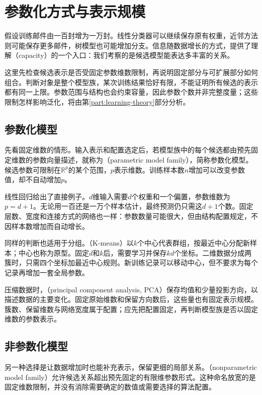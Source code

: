 \section{参数化方式与表示规模}
\label{sec:models-capacity}

假设训练邮件由一百封增为一万封。线性分类器可以继续保存原有权重，近邻方法则可能保存更多邮件，树模型也可能增加分支。信息随数据增长的方式，提供了理解（capacity）的一个入口：我们考察的是候选模型能表达多丰富的关系。

这里先检查候选表示是否受固定参数维数限制，再说明固定部分与可扩展部分如何组合。判断对象是整个模型族，某次训练结果恰好有限，不能证明所有候选的表示都有同一上限。参数范围与结构也会约束容量，因此参数个数并非完整度量；这些限制怎样影响泛化，将由第\ref{part:learning-theory}部分分析。

\subsection{参数化模型}
\label{sec:models-parametric}

先看固定维数的情形。输入表示和配置选定后，若模型族中的每个候选都由预先固定维数的参数向量描述，就称为（parametric model family），简称参数化模型。候选参数可限制在$\mathbb{R}^{p}$的某个范围，$p$表示维数。训练样本数$n$增加可以改变参数值，却不自动增加$p$。

线性回归给出了直接例子。$d$维输入需要$d$个权重和一个偏置，参数维数为$p=d+1$。无论用一百还是一万个样本估计，最终预测仍只需这$d+1$个数。固定层数、宽度和连接方式的网络也一样：参数数量可能很大，但由结构配置规定，不因样本数增加而自动增长。

同样的判断也适用于分组。（K-means）以$k$个中心代表群组，按最近中心分配新样本；中心也称为原型。固定$d$和$k$后，需要学习并保存$kd$个坐标。二维数据分成两簇时，只需四个坐标加最近中心规则。新训练记录可以移动中心，但不要求为每个记录再增加一套全局参数。

压缩数据时，（principal component analysis, PCA）保存均值和少量投影方向，以描述数据的主要变化。固定原始维数和保留方向数后，这些量也有固定表示规模。簇数、保留维数与网络宽度属于配置；应先把配置固定，再判断模型族是否以固定维数的参数表示。

\subsection{非参数化模型}
\label{sec:models-nonparametric}

另一种选择是让数据增加时也能补充表示，保留更细的局部关系。（nonparametric model family）允许候选关系超出预先固定的有限维参数形式。这种命名放宽的是固定维数限制，并没有消除需要确定的数值或需要选择的算法配置。

